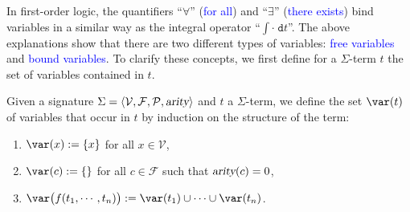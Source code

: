 In first-order logic, the quantifiers ``$\forall$'' (\textcolor{blue}{for all}) and ``$\exists$''
(\textcolor{blue}{there exists}) bind variables in a similar way as the integral operator
``$\int \cdot\; \mathtt{d}t$''. The above explanations show that there are two different types of 
variables: \textcolor{blue}{free variables} and \textcolor{blue}{bound variables}.
To clarify these concepts, we first define for a
$\Sigma$-term $t$ the set of variables contained in $t$.

\begin{Definition}[$\var(t)$]
  Given a signature $\Sigma = \langle \mathcal{V}, \mathcal{F}, \mathcal{P}, \textsl{arity} \rangle$ and
  $t$ a $\Sigma$-term, we define the set \textcolor{blue}{$\var(t)$} of variables that occur in $t$
  by induction on the structure of the term:
  \begin{enumerate}
    \item $\var(x) := \{ x \}$ \quad for all $x \in \mathcal{V}$,
    \item $\var(c) := \{ \}$ \quad for all $c \in \mathcal{F}$ such that $\textsl{arity}(c) = 0$,
    \item $\var\bigl(f(t_1,\cdots,t_n)\bigr) := \var(t_1) \cup \cdots \cup \var(t_n)$.
          \eox
  \end{enumerate}
\end{Definition}

